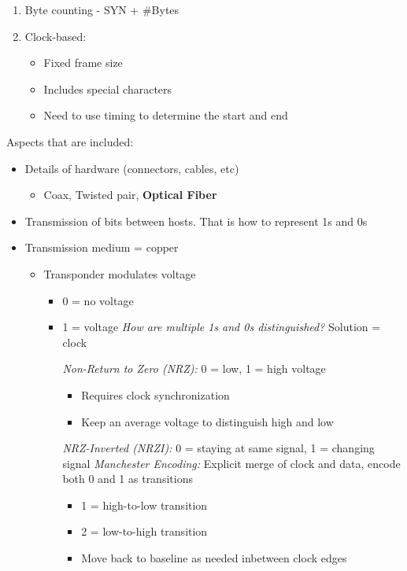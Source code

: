 \documentclass[11pt]{article}
\begin{document}
\begin{enumerate}
\item Byte counting - SYN + \#Bytes
\item Clock-based:
\begin{itemize}
\item Fixed frame size
\item Includes special characters
\item Need to use timing to determine the start and end
\end{itemize}
\end{enumerate}

Aspects that are included:
\begin{itemize}
\item Details of hardware (connectors, cables, etc)
\begin{itemize}
\item Coax, Twisted pair, \textbf{Optical Fiber}
\end{itemize}
\item Transmission of bits between hosts. That is how to represent 1s and 0s

\item Transmission medium = copper
\begin{itemize}
\item Transponder modulates voltage
\begin{itemize}
\item 0 = no voltage
\item 1 = voltage
\emph{How are multiple 1s and 0s distinguished?}
Solution = clock

\emph{Non-Return to Zero (NRZ):} 0 = low, 1 = high voltage
\begin{itemize}
\item Requires clock synchronization
\item Keep an average voltage to distinguish high and low
\end{itemize}
\emph{NRZ-Inverted (NRZI):} 0 = staying at same signal, 1 = changing signal
\emph{Manchester Encoding:} Explicit merge of clock and data, encode both 0
and 1 as transitions
\begin{itemize}
\item 1 = high-to-low transition
\item 2 = low-to-high transition
\item Move back to baseline as needed inbetween clock edges
\end{itemize}
\end{itemize}
\end{itemize}
\end{itemize}
\end{document}
